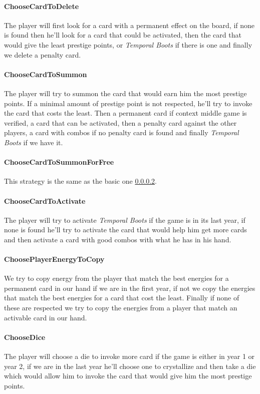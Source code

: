 \begin{appendices}
\paragraph{ChooseCardToDelete}
The player will first look for a card with a permanent effect on the board, if none is found then he'll look for a card that could be activated, then the card that would give the least prestige points, or \textit{Temporal Boots} if there is one and finally we delete a penalty card.

\paragraph{ChooseCardToSummon}
\label{card_to_summon}The player will try to summon the card that would earn him the most prestige points. If a minimal amount of prestige point is not respected, he'll try to invoke the card that costs the least. Then a permanent card if context middle game is verified, a card that can be activated, then a penalty card against the other players, a card with combos if no penalty card is found and finally \textit{Temporal Boots} if we have it.

\paragraph{ChooseCardToSummonForFree}
This strategy is the same as the basic one \ref{card_to_summon}.

\paragraph{ChooseCardToActivate}
The player will try to activate \textit{Temporal Boots} if the game is in its last year, if none is found he'll try to activate the card that would help him get more cards and then activate a card with good combos with what he has in his hand.

\paragraph{ChoosePlayerEnergyToCopy}
We try to copy energy from the player that match the best energies for a permanent card in our hand if we are in the first year, if not we copy the energies that match the best energies for a card that cost the least. Finally if none of these are respected we try to copy the energies from a player that match an activable card in our hand.

\paragraph{ChooseDice}
The player will choose a die to invoke more card if the game is either in year 1 or year 2, if we are in the last year he'll choose one to crystallize and then take a die which would allow him to invoke the card that would give him the most prestige points.


\end{appendices}
